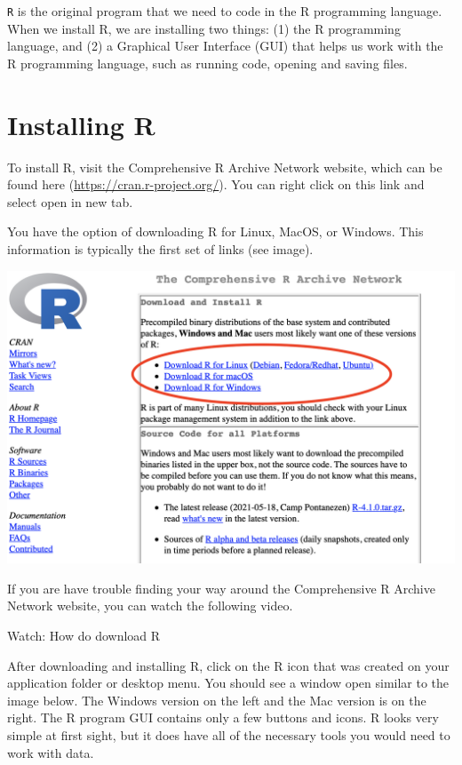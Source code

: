 \documentclass[
]{book}
\begin{document}
\texttt{R} is the original program that we need to code in the R programming language. When we install R, we are installing two things: (1) the R programming language, and (2) a Graphical User Interface (GUI) that helps us work with the R programming language, such as running code, opening and saving files.

\hypertarget{installing-r}{%
\section{Installing R}\label{installing-r}}

To install R, visit the Comprehensive R Archive Network website, which can be found here (\url{https://cran.r-project.org/}). You can right click on this link and select open in new tab.

You have the option of downloading R for Linux, MacOS, or Windows. This information is typically the first set of links (see image).

\includegraphics[width=1\linewidth]{images-figures/02-r-website}

If you are have trouble finding your way around the Comprehensive R Archive Network website, you can watch the following video.

Watch: How do download R

After downloading and installing R, click on the R icon that was created on your application folder or desktop menu. You should see a window open similar to the image below. The Windows version on the left and the Mac version is on the right. The R program GUI contains only a few buttons and icons. R looks very simple at first sight, but it does have all of the necessary tools you would need to work with data.
\end{document}
